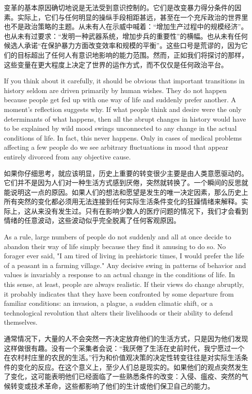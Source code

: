 \begin{paracol}{2}
\switchcolumn
变革的基本原因确切地说是无法受到意识控制的。它们是改变暴力得分条件的因素。实际上，它们与任何明显的操纵手段相距甚远，甚至在一个充斥政治的世界里也不是政治策略的主题。从未有人在示威中喊着：“增加生产过程中的规模经济”。也从未有过要求：“发明一种武器系统，增加步兵的重要性”的横幅。也从未有任何候选人承诺“在保护暴力方面改变效率和规模的平衡”。这些口号是荒谬的，因为它们的目标超出了任何人有意识地影响的能力范围。然而，正如我们将探讨的那样，这些变量在更大程度上决定了世界的运作方式，而不仅仅是任何政治平台。

\switchcolumn*
If you think about it carefully, it should be obvious that important transitions in history seldom are driven primarily by human wishes. They do not happen because people get fed up with one way of life and suddenly prefer another. A moment's reflection suggests why. If what people think and desire were the only determinants of what happens, then all the abrupt changes in history would have to be explained by wild mood swings unconnected to any change in the actual conditions of life. In fact, this never happens. Only in cases of medical problems affecting a few people do we see arbitrary fluctuations in mood that appear entirely divorced from any objective cause.

\switchcolumn
如果你仔细思考，就应该明显，历史上重要的转变很少主要是由人类意愿驱动的。它们并不是因为人们对一种生活方式感到厌倦，突然就转换了。一个瞬间的反思就能说明这一点的原因。如果人们的想法和愿望是发生的唯一决定因素，那么历史上所有突然的变化都必须用无法连接到任何实际生活条件变化的狂躁情绪来解释。实际上，这从来没有发生过。只有在影响少数人的医疗问题的情况下，我们才会看到情绪的任意波动，这些波动似乎完全脱离了任何客观原因。

\switchcolumn*
As a rule, large numbers of people do not suddenly and all at once decide to abandon their way of life simply because they find it amusing to do so. No forager ever said, "I am tired of living in prehistoric times, I would prefer the life of a peasant in a farming village." Any decisive swing in patterns of behavior and values is invariably a response to an actual change in the conditions of life. In this sense, at least, people are always realistic. If their views do change abruptly, it probably indicates that they have been confronted by some departure from familiar conditions: an invasion, a plague, a sudden climatic shift, or a technological revolution that alters their livelihoods or their ability to defend themselves.

\switchcolumn
通常情况下，大量的人不会突然一齐决定放弃他们的生活方式，只是因为他们发现这样做很有趣。没有一个采集者会说：“我厌倦了生活在史前时代，我宁愿过一个在农村村庄里的农民的生活。”行为和价值观决策的决定性转变往往是对实际生活条件的变化的反应。在这个意义上，至少人们总是现实的。如果他们的观点突然发生了变化，这可能表明他们已经面临了一些熟悉条件的改变：入侵、瘟疫、突然的气候转变或技术革命，这些都影响了他们的生计或他们保卫自己的能力。


\end{paracol}
